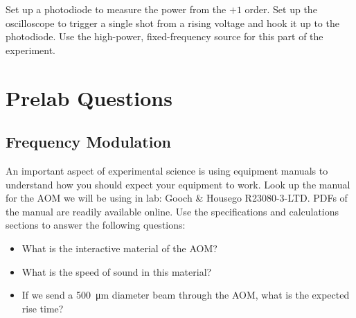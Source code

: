 \documentclass[]{manual}
\begin{document}
    Set up a photodiode to measure the power from the $+1$ order.
    Set up the oscilloscope to trigger a single shot from a rising voltage and hook it up to the photodiode.
    Use the high-power, fixed-frequency source for this part of the experiment.


    \FloatBarrier
    \newpage

    \section*{Prelab Questions}
    \setcounter{subsection}{0}

    \subsection*{Frequency Modulation}

    An important aspect of experimental science is using equipment manuals to understand how you should expect your equipment to work.
    Look up the manual for the AOM we will be using in lab: Gooch \& Housego R23080-3-LTD.
    PDFs of the manual are readily available online.
    Use the specifications and calculations sections to answer the following questions:
    \begin{itemize}
    	\item What is the interactive material of the AOM?
    	\item What is the speed of sound in this material?
    	\item If we send a \SI{500}{\micro\meter} diameter beam through the AOM, what is the expected rise time?
    \end{itemize}

\end{document}
